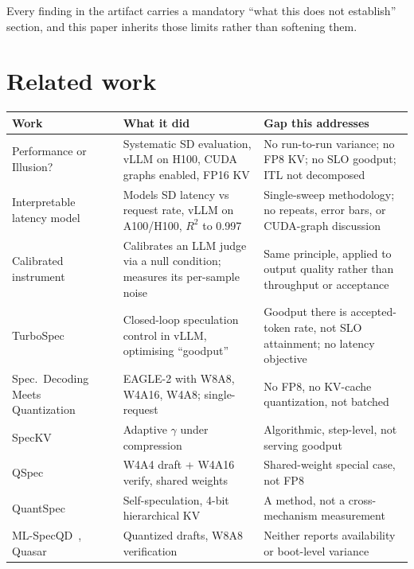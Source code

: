 \documentclass[11pt]{article}
\begin{document}
\noindent
Every finding in the artifact carries a mandatory ``what this does not
establish'' section, and this paper inherits those limits rather than
softening them.

\section{Related work}\label{sec:related}

\begin{table}[h]\centering\small
\renewcommand{\arraystretch}{1.15}
\begin{tabular}{>{\raggedright\arraybackslash}p{}>{\raggedright\arraybackslash}p{}>{\raggedright\arraybackslash}p{}}
\toprule
Work & What it did & Gap this addresses\\
\midrule
Performance or Illusion?~\cite{liu2026illusion} & Systematic SD evaluation, vLLM on H100, CUDA graphs enabled, FP16 KV & No run-to-run variance; no FP8 KV; no SLO goodput; ITL not decomposed\\
Interpretable latency model~\cite{kong2026latency} & Models SD latency vs request rate, vLLM on A100/H100, $R^2$ to 0.997 & Single-sweep methodology; no repeats, error bars, or CUDA-graph discussion\\
Calibrated instrument~\cite{kaplan2026calibrated} & Calibrates an LLM judge via a null condition; measures its per-sample noise & Same principle, applied to output quality rather than throughput or acceptance\\
TurboSpec~\cite{liu2024turbospec} & Closed-loop speculation control in vLLM, optimising ``goodput'' & Goodput there is accepted-token rate, not SLO attainment; no latency objective\\
Spec.\ Decoding Meets Quantization~\cite{specquant2025} & EAGLE-2 with W8A8, W4A16, W4A8; single-request & No FP8, no KV-cache quantization, not batched\\
SpecKV~\cite{speckv2026} & Adaptive $\gamma$ under compression & Algorithmic, step-level, not serving goodput\\
QSpec~\cite{qspec2025} & W4A4 draft + W4A16 verify, shared weights & Shared-weight special case, not FP8\\
QuantSpec~\cite{quantspec2025} & Self-speculation, 4-bit hierarchical KV & A method, not a cross-mechanism measurement\\
ML-SpecQD~\cite{mlspecqd2025}, Quasar~\cite{quasar2026} & Quantized drafts, W8A8 verification & Neither reports availability or boot-level variance\\
\bottomrule
\end{tabular}
\end{table}
\end{document}

